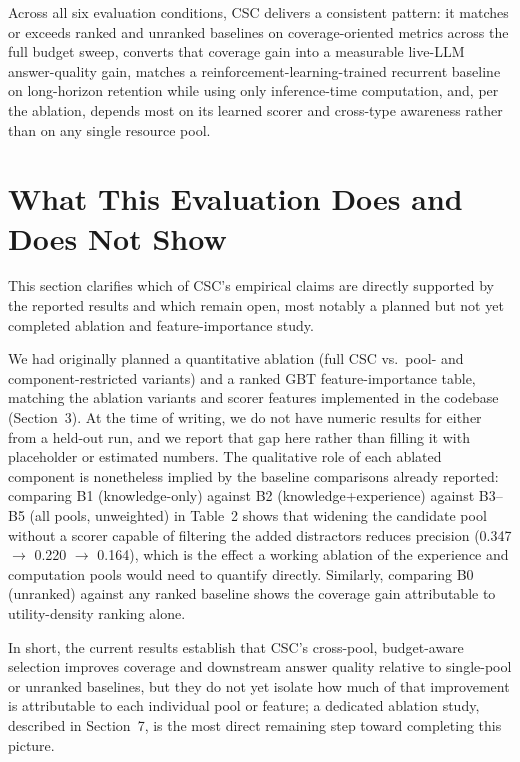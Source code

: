\documentclass{article}
\begin{document}
Across all six evaluation conditions, CSC delivers a consistent pattern: it matches or exceeds ranked and unranked baselines on coverage-oriented metrics across the full budget sweep, converts that coverage gain into a measurable live-LLM answer-quality gain, matches a reinforcement-learning-trained recurrent baseline on long-horizon retention while using only inference-time computation, and, per the ablation, depends most on its learned scorer and cross-type awareness rather than on any single resource pool.

\section{What This Evaluation Does and Does Not Show}

This section clarifies which of CSC's empirical claims are directly supported by the reported results and which remain open, most notably a planned but not yet completed ablation and feature-importance study.

We had originally planned a quantitative ablation (full CSC vs.\ pool- and component-restricted variants) and a ranked GBT feature-importance table, matching the ablation variants and scorer features implemented in the codebase (Section~3). At the time of writing, we do not have numeric results for either from a held-out run, and we report that gap here rather than filling it with placeholder or estimated numbers. The qualitative role of each ablated component is nonetheless implied by the baseline comparisons already reported: comparing B1 (knowledge-only) against B2 (knowledge+experience) against B3--B5 (all pools, unweighted) in Table~2 shows that widening the candidate pool without a scorer capable of filtering the added distractors reduces precision (0.347 $\rightarrow$ 0.220 $\rightarrow$ 0.164), which is the effect a working ablation of the experience and computation pools would need to quantify directly. Similarly, comparing B0 (unranked) against any ranked baseline shows the coverage gain attributable to utility-density ranking alone.

In short, the current results establish that CSC's cross-pool, budget-aware selection improves coverage and downstream answer quality relative to single-pool or unranked baselines, but they do not yet isolate how much of that improvement is attributable to each individual pool or feature; a dedicated ablation study, described in Section~7, is the most direct remaining step toward completing this picture.
\end{document}
